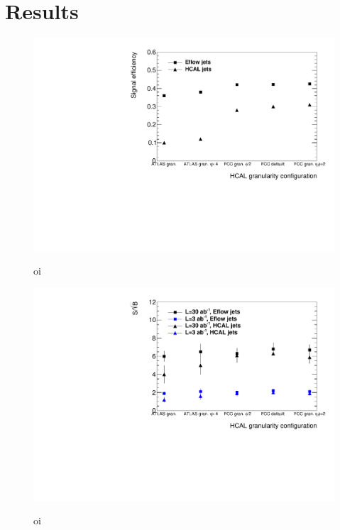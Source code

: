 
\section{Results}
\label{sec:resul}


\begin{figure}[h]
	\centering
	\includegraphics[width=\linewidth]{./images/EffPlotGran.pdf}
	\label{fig:eff_gran}
	\caption{oi}
\end{figure}

\begin{figure}[h]
	\centering
	\includegraphics[width=\linewidth]{./images/SSBplotGran.pdf}
	\label{fig:SSB_gran}
	\caption{oi}
\end{figure}

